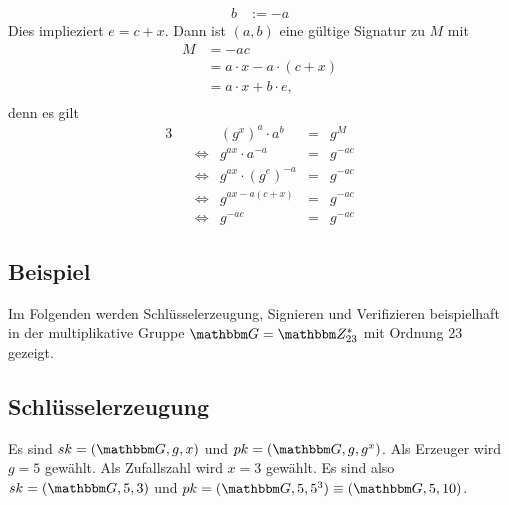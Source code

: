 \begin{description}
\begin{align*}
	b &:= -a
	\end{align*}
        Dies implieziert $e=c+x$. 
	Dann ist $(a, b)$ eine gültige Signatur zu $M$ mit
	\begin{align*}
          M &= -ac\\
            &= a \cdot x - a \cdot (c + x)\\
            &= a \cdot x + b \cdot e,\\
	\end{align*}
        denn es gilt 
        \begin{alignat*}{3}
          &&                 & (g^x)^a\cdot a^b       &= &g^M\\
          && \Leftrightarrow & g^{ax} \cdot a^{-a}     &= &g^{-ac}\\
          && \Leftrightarrow & g^{ax} \cdot (g^e)^{-a} &= &g^{-ac}\\
          && \Leftrightarrow & g^{ax-a(c+x)}            &= &g^{-ac}\\
          && \Leftrightarrow & g^{-ac}                 &= &g^{-ac}
        \end{alignat*}
      \end{description}
      \subsection{Beispiel}
      Im Folgenden werden Schlüsselerzeugung, Signieren und Verifizieren beispielhaft
      in der multiplikative Gruppe $\G = \Z{23}^{*}$ mit Ordnung 23 gezeigt. 
      \subsection*{Schlüsselerzeugung}
      Es sind $\skey = (\G, g, x)$ und $\pkey = (\G, g, g^x)$. Als
      Erzeuger wird $g=5$ gewählt. Als Zufallszahl wird $x=3$
      gewählt. Es sind also $\skey = (\G, 5, 3)$ und $\pkey = (\G, 5,
      5^3)\equiv (\G, 5, 10)$.

